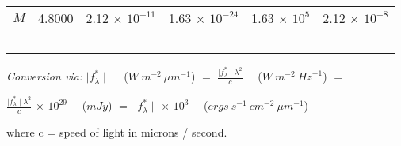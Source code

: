 \documentclass[a4paper]{book}
\renewcommand{\_}{{\tt\char'137}}
\begin{document}
\begin{table}
\begin{center}
\begin{tabular}{|c|c|c|c|c|c|}
$M$  &  4.8000  &  2.12 $\times$ $10^{-11}$ & 1.63 $\times$ $10^{-24}$ & 1.63 $\times$ $10^{5}$ & 2.12 $\times$ $10^{-8}$ \\
\ \ & \ \ & \ \ & \ \ & \ \ & \ \  \\
\hline
\end{tabular}
\vglue 0.3cm
{\em Conversion via: }
$\mid f_{\lambda}^{*} \mid$ \ \ ($W \ m^{-2} \ {\mu m}^{-1}$) $=$ 
$\frac{\mid f_{\lambda}^{*} \mid \lambda^{2}}{c}$ \ \ ($W \ m^{-2} \ {Hz}^{-1}$) $=$

$\frac{\mid f_{\lambda}^{*} \mid \lambda^{2}}{c}$ $\times$ $10^{29}$  \ \ ($mJy$) $=$
$\mid f_{\lambda}^{*} \mid$ $\times$ $10^{3}$ \ \ ($ergs \ s^{-1} \ cm^{-2} \ {\mu m}^{-1}$)

\vglue 0.1cm

where c = speed of light in microns / second.

\vglue 0.3cm
\end{center}
\end{table}
\end{document}
